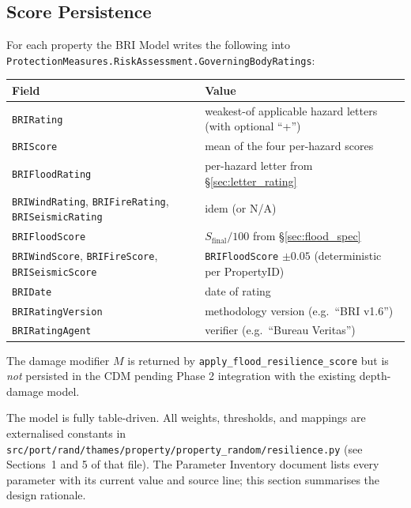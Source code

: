 \documentclass[11pt,a4paper]{article}
\begin{document}
\subsection{Score Persistence}
For each property the BRI Model writes the following into
\texttt{ProtectionMeasures.RiskAssessment.GoverningBodyRatings}:

\begin{center}
\begin{tabular}{ll}
    \toprule
    \textbf{Field} & \textbf{Value} \\
    \midrule
    \texttt{BRIRating}        & weakest-of applicable hazard letters (with optional ``+'') \\
    \texttt{BRIScore}         & mean of the four per-hazard scores \\
    \texttt{BRIFloodRating}   & per-hazard letter from \S\ref{sec:letter_rating} \\
    \texttt{BRIWindRating}, \texttt{BRIFireRating}, \texttt{BRISeismicRating} & idem (or N/A) \\
    \texttt{BRIFloodScore}    & $S_{\text{final}}/100$ from \S\ref{sec:flood_spec} \\
    \texttt{BRIWindScore}, \texttt{BRIFireScore}, \texttt{BRISeismicScore} & \texttt{BRIFloodScore} $\pm 0.05$ (deterministic per PropertyID) \\
    \texttt{BRIDate}          & date of rating \\
    \texttt{BRIRatingVersion} & methodology version (e.g.\ ``BRI v1.6'') \\
    \texttt{BRIRatingAgent}   & verifier (e.g.\ ``Bureau Veritas'') \\
    \bottomrule
\end{tabular}
\end{center}

\noindent The damage modifier $M$ is returned by
\texttt{apply\_flood\_resilience\_score} but is \emph{not} persisted in the CDM
pending Phase 2 integration with the existing depth-damage model.

\mkminputs

The model is fully table-driven. All weights, thresholds, and mappings are
externalised constants in
\texttt{src/port/rand/thames/property/property\_random/resilience.py}
(see Sections~1 and 5 of that file). The Parameter Inventory document lists every
parameter with its current value and source line; this section summarises the
design rationale.
\end{document}
